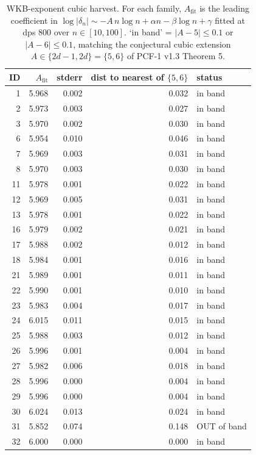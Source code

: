 \begin{table}[ht]
\centering
\small
\caption{WKB-exponent cubic harvest. For each family, $A_{\mathrm{fit}}$ is the leading coefficient in $\log|\delta_n| \sim -A\, n\log n + \alpha n - \beta\log n + \gamma$ fitted at dps 800 over $n\in[10,100]$. `in band' = $|A-5|\le 0.1$ or $|A-6|\le 0.1$, matching the conjectural cubic extension $A\in\{2d-1,2d\}=\{5,6\}$ of PCF-1 v1.3 Theorem 5.}
\label{tab:pcf2-sessionB-wkb}
\begin{tabular}{rrrrl}
\hline
\textbf{ID} & \textbf{$A_{\mathrm{fit}}$} & \textbf{stderr} & \textbf{dist to nearest of $\{5,6\}$} & \textbf{status} \\ \hline
1 & 5.968 & 0.002 & 0.032 & in band \\
2 & 5.973 & 0.003 & 0.027 & in band \\
3 & 5.970 & 0.002 & 0.030 & in band \\
6 & 5.954 & 0.010 & 0.046 & in band \\
7 & 5.969 & 0.003 & 0.031 & in band \\
8 & 5.970 & 0.003 & 0.030 & in band \\
11 & 5.978 & 0.001 & 0.022 & in band \\
12 & 5.969 & 0.005 & 0.031 & in band \\
13 & 5.978 & 0.001 & 0.022 & in band \\
16 & 5.979 & 0.002 & 0.021 & in band \\
17 & 5.988 & 0.002 & 0.012 & in band \\
18 & 5.984 & 0.001 & 0.016 & in band \\
21 & 5.989 & 0.001 & 0.011 & in band \\
22 & 5.990 & 0.001 & 0.010 & in band \\
23 & 5.983 & 0.004 & 0.017 & in band \\
24 & 6.015 & 0.011 & 0.015 & in band \\
25 & 5.988 & 0.003 & 0.012 & in band \\
26 & 5.996 & 0.001 & 0.004 & in band \\
27 & 5.982 & 0.006 & 0.018 & in band \\
28 & 5.996 & 0.000 & 0.004 & in band \\
29 & 5.996 & 0.000 & 0.004 & in band \\
30 & 6.024 & 0.013 & 0.024 & in band \\
31 & 5.852 & 0.074 & 0.148 & OUT of band \\
32 & 6.000 & 0.000 & 0.000 & in band \\

\end{tabular}
\end{table}
